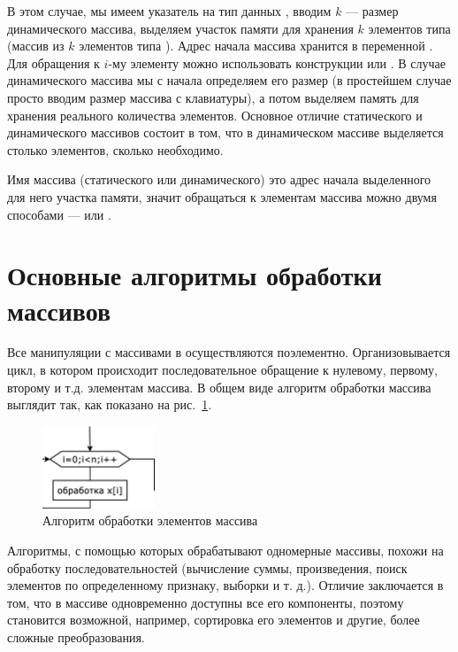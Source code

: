 В этом случае, мы имеем указатель на тип данных , вводим $k$ --- размер динамического массива, выделяем
участок памяти для хранения $k$ элементов типа  (массив из
$k$  элементов типа ). Адрес начала массива хранится в переменной
. Для обращения к $i$-му элементу можно использовать конструкции  или
. В случае динамического массива мы с начала определяем его размер (в простейшем случае просто
вводим размер массива с клавиатуры), а потом выделяем память для хранения реального количества элементов. 
Основное отличие статического и динамического массивов состоит в том, что в динамическом массиве выделяется столько
элементов, сколько необходимо.

Имя массива (статического или динамического) это адрес начала выделенного для него участка памяти, значит обращаться к элементам массива можно двумя способами ---  или .



\section[Основные алгоритмы обработки массивов]{Основные алгоритмы обработки массивов}
Все манипуляции с массивами в  осуществляются поэлементно. Организовывается цикл, в котором происходит
последовательное обращение к нулевому, первому, второму и т.д. элементам массива. В общем виде алгоритм обработки
массива выглядит так, как показано на рис.~\ref{ch05:refDrawing0}.

\begin{figure}[htb]
\begin{center}
\includegraphics[width=0.3\textwidth]{img/ris_5_1}
\caption{Алгоритм обработки элементов массива}
\label{ch05:refDrawing0}
\end{center}
\end{figure}

Алгоритмы, с помощью которых обрабатывают одномерные массивы, похожи на обработку последовательностей (вычисление суммы,
произведения, поиск элементов по определенному признаку, выборки и т. д.). Отличие заключается в том, что в массиве
одновременно доступны все его компоненты, поэтому становится возможной, например, сортировка его элементов и другие,
более сложные преобразования.

